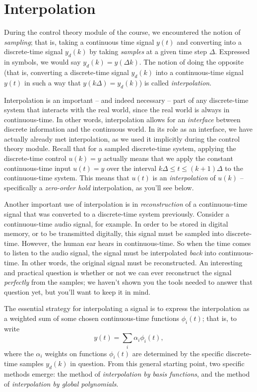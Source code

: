 
\section{Interpolation}

During the control theory module of the course, we encountered the notion of \emph{sampling}; that is, taking a continuous time signal $y(t)$ and converting into a discrete-time signal $y_d(k)$ by taking \emph{samples} at a given time step $\Delta$. Expressed in symbols, we would say $y_d(k)=y(\Delta k)$.
The notion of doing the opposite (that is, converting a discrete-time signal $y_d(k)$ into a continuous-time signal $y(t)$ in such a way that $y(k\Delta)=y_d(k)$) is called \emph{interpolation}.

Interpolation is an important -- and indeed necessary -- part of any discrete-time system that interacts with the real world, since the real world is always in continuous-time.
In other words, interpolation allows for an \emph{interface} between discrete information and the continuous world.
In its role as an interface, we have actually already met interpolation, as we used it implicitly during the control theory module.
Recall that for a sampled discrete-time system, applying the discrete-time control $u(k)=y$ actually means that we apply the constant continuous-time input $u(t)=y$ over the interval $k\Delta\le t \le (k+1)\Delta$ to the continuous-time system.
This means that $u(t)$ is an \emph{interpolation} of $u(k)$ -- specifically a \emph{zero-order hold} interpolation, as you'll see below.

Another important use of interpolation is in \emph{reconstruction} of a continuous-time signal that was converted to a discrete-time system previously.
Consider a continuous-time audio signal, for example.
In order to be stored in digital memory, or to be transmitted digitally, this signal must be sampled into discrete-time.
However, the human ear hears in continuous-time. 
So when the time comes to listen to the audio signal, the signal must be interpolated \emph{back} into continuous-time. 
In other words, the original signal must be reconstructed.
An interesting and practical question is whether or not we can ever reconstruct the signal \emph{perfectly} from the samples; we haven't shown you the tools needed to answer that question yet, but you'll want to keep it in mind.

The essential strategy for interpolating a signal is to express the interpolation as a weighted sum of some chosen continuous-time functions $\phi_i(t)$; that is, to write
\begin{equation*}
 y(t) = \sum_i \alpha_i \phi_i(t),
\end{equation*}
where the $\alpha_i$ weights on functions $\phi_i(t)$ are determined by the specific discrete-time samples $y_d(k)$ in question. 
From this general starting point, two specific methods emerge: the method of \emph{interpolation by basis functions}, and the method of \emph{interpolation by global polynomials}.

